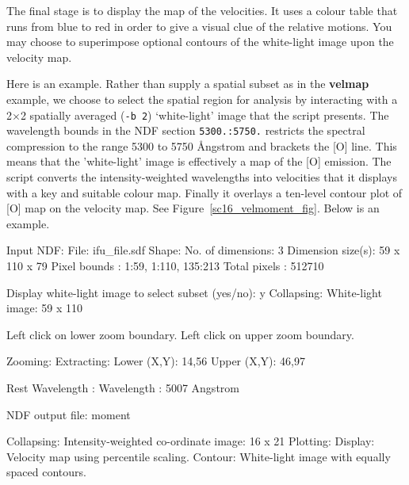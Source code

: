 \documentclass[twoside,11pt]{starlink}
\begin{document}
The final stage is to display the map of the velocities.  It uses a
colour table that runs from blue to red in order to give a visual clue
of the relative motions.  You may choose to superimpose optional
contours of the white-light image upon the velocity map.

Here is an example.  Rather than supply a spatial subset as in the
\textbf{velmap} example, we choose to select the spatial region for
analysis by interacting with a 2$\times$2 spatially averaged (\texttt{-b
2}) `white-light' image that the script presents.  The wavelength
bounds in the NDF section \texttt{5300.:5750.} restricts the spectral
compression to the range 5300 to 5750 {\AA}ngstrom and brackets the
[O{}] line.  This means that the 'white-light' image is
effectively a map of the [O{}] emission.  The script converts the
intensity-weighted wavelengths into velocities that it displays with a
key and suitable colour map.  Finally it overlays a ten-level contour
plot of [O{}] map on the velocity map.  See
Figure~\ref{sc16_velmoment_fig}.  Below is an
example.



\begin{small}
\begin{terminalv}

     Input NDF:
       File: ifu_file.sdf
     Shape:
       No. of dimensions: 3
       Dimension size(s): 59 x 110 x 79
       Pixel bounds     : 1:59, 1:110, 135:213
       Total pixels     : 512710

Display white-light image to select subset (yes/no): y
     Collapsing:
       White-light image: 59 x 110

 Left click on lower zoom boundary.
 Left click on upper zoom boundary.

     Zooming:
     Extracting:
       Lower (X,Y): 14,56
       Upper (X,Y): 46,97

     Rest Wavelength :
       Wavelength  : 5007 Angstrom

NDF output file: moment

     Collapsing:
       Intensity-weighted co-ordinate image: 16 x 21
     Plotting:
       Display: Velocity map using percentile scaling.
       Contour: White-light image with equally spaced contours.
\end{terminalv}
\end{small}
\end{document}
